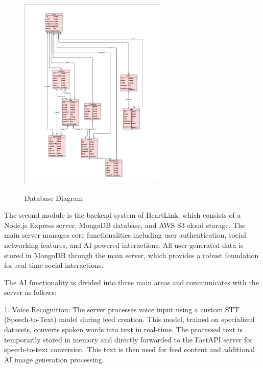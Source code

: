             \begin{figure}[htbp]
                \centerline{\includegraphics[width = 7cm, height = 10cm]{Images/struct/db.png}}
                \label{fig}
                \caption{Database Diagram}
            \end{figure}
            The second module is the backend system of HeartLink, which consists of a Node.js Express server, MongoDB database, and AWS S3 cloud storage. The main server manages core functionalities including user authentication, social networking features, and AI-powered interactions. All user-generated data is stored in MongoDB through the main server, which provides a robust foundation for real-time social interactions.
            
            The AI functionality is divided into three main areas and communicates with the server as follows:
            
            1. Voice Recognition: The server processes voice input using a custom STT (Speech-to-Text) model during feed creation. This model, trained on specialized datasets, converts spoken words into text in real-time. The processed text is temporarily stored in memory and directly forwarded to the FastAPI server for speech-to-text conversion. This text is then used for feed content and additional AI image generation processing.
                
